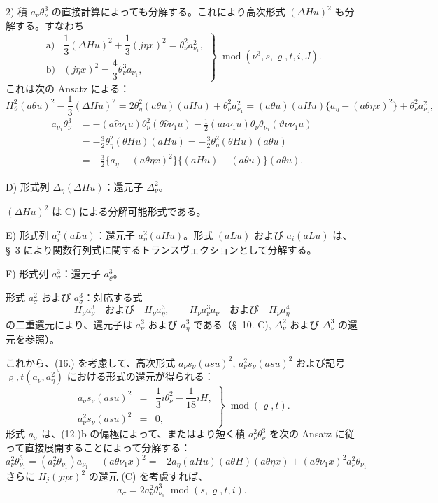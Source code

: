 \documentclass[11pt]{jlreq}
\newcommand{\A}{\Delta}
\newcommand{\R}{\varrho}
\newcommand{\modu}[1]{\;\operatorname{mod} #1}
\begin{document}
2) 積 $a_\nu\theta_\nu^3$ の直接計算によっても分解する。これにより高次形式 $(\A Hu)^2$ も分解する。すなわち
\[
\tag{18}
\left.\begin{array}{ll}
\text{a)}&\dfrac13(\A Hu)^2+\dfrac13(j\eta x)^2=\theta_\nu^2a_{\nu_1}^2,\\[0.6em]
\text{b)}&(j\eta x)^2=\dfrac43\theta_\nu^3a_{\nu_1},
\end{array}\right\}\modu{(\nu^3,s,\R,t,i,J)}.
\]
これは次の Ansatz による：
\[
H_\vartheta^2(a\theta u)^2-\frac13(\A Hu)^2
=2\theta_\eta^2(a\theta u)(aHu)+\theta_\nu^2a_{\nu_1}^2
=(a\theta u)(aHu)\{a_\eta-(a\theta\eta x)^2\}+\theta_\nu^2a_{\nu_1}^2,
\]
\[
\begin{aligned}
a_{\nu_1}\theta_\nu^3
&=-(a\widehat{\nu}\nu_1u)\theta_\nu^2(\theta\widehat{\nu}\nu_1u)
-\frac12(u\nu\nu_1u)\theta_\nu\theta_{\nu_1}(\vartheta\nu\nu_1u)\\
&=-\frac32\theta_\eta^2(\theta Hu)(aHu)
=-\frac32\theta_\eta^2(\theta Hu)(a\theta u)\\
&=-\frac32\{a_\eta-(a\theta\eta x)^2\}\{(aHu)-(a\theta u)\}(a\theta u).
\end{aligned}
\]

\noindent D) 形式列 $\A_\eta(\A Hu)$：還元子 $\A_\nu^2$。

$(\A Hu)^2$ は C) による分解可能形式である。

\noindent E) 形式列 $a_i^2(aLu)$：還元子 $a_\eta^2(aHu)$。形式 $(aLu)$ および $a_i(aLu)$ は、\S\ 3 により関数行列式に関するトランスヴェクションとして分解する。

\noindent F) 形式列 $a_\sigma^3$：還元子 $a_\R^3$。

形式 $a_\sigma^2$ および $a_\sigma^3$：対応する式
\[
H_\nu a_\nu^3\quad\text{および}\quad H_\nu a_\eta^3,
\qquad
H_\nu a_\nu^3a_\nu\quad\text{および}\quad H_\nu a_\eta^4
\]
の二重還元により、還元子は $a_\nu^3$ および $a_\eta^3$ である（\S\ 10. C), $\A_\nu^2$ および $\A_\nu^3$ の還元を参照）。

これから、(16.) を考慮して、高次形式 $a_\nu s_\nu(asu)^2$, $a_\nu^2s_\nu(asu)^2$ および記号 $\R,t(a_\nu,a_\eta^2)$ における形式の還元が得られる：
\[
\tag{19}
\left.\begin{array}{rcl}
a_\nu s_\nu(asu)^2&=&\dfrac13 i\theta_\nu^2-\dfrac1{18}iH,\\[0.5em]
a_\nu^2s_\nu(asu)^2&=&0,
\end{array}\right\}\modu{(\R,t)}.
\]
形式 $a_\sigma$ は、(12.)b の偏極によって、またはより短く積 $a_\nu^2\theta_\nu^3$ を次の Ansatz に従って直接展開することによって分解する：
\[
a_\nu^2\theta_{\nu_1}^3=(a_\nu^2\theta_{\nu_1})a_{\nu_1}-(a\theta\nu_1x)^2
=-2a_\eta(aHu)(a\theta H)(a\theta\eta x)+(a\theta\nu_1x)^2a_\nu^2\theta_{\nu_1}
\]
さらに $H_j(j\eta x)^2$ の還元 (C) を考慮すれば、
\[
\tag{20}a_\sigma=2a_\nu^2\theta_{\nu_1}^3\modu{(s,\R,t,i)}.
\]
\end{document}
